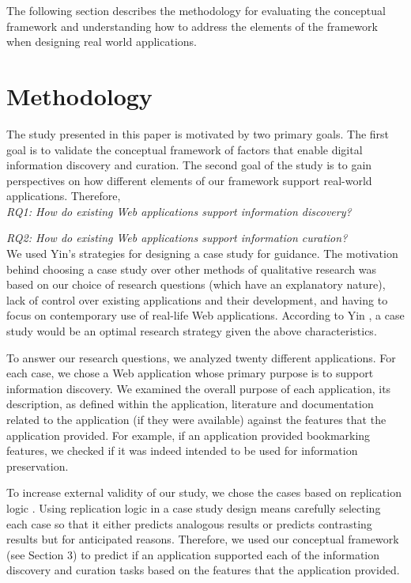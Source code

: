 \documentclass{casconpaper}
\begin{document}
The following section describes the methodology for evaluating the conceptual framework and understanding how to address the elements of the framework when designing real world applications.

{\section{Methodology}
The study presented in this paper is motivated by two primary goals. The first goal is to validate the conceptual framework of factors that enable digital information discovery and curation. The second goal of the study is to gain perspectives on how different elements of our framework support real-world applications. Therefore, 
\\

\emph{RQ1: How do existing Web applications support information discovery?}

\emph{RQ2: How do existing Web applications support information curation?}\\


We used Yin’s strategies for designing a case study \cite{yin} for guidance. The motivation behind choosing a case study over other methods of qualitative research was based on our choice of research questions (which have an explanatory nature), lack of control over existing applications and their development, and having to focus on contemporary use of real-life Web applications. According to Yin \cite{yin}, a case study would be an optimal research strategy given the above characteristics.

To answer our research questions, we analyzed twenty different applications. For each case, we chose a Web application whose primary purpose is to support information discovery. We examined the overall purpose of each application, its description, as defined within the application, literature and documentation related to the application (if they were available) against the features that the application provided. For example, if an application provided bookmarking features, we checked if it was indeed intended to be used for information preservation. 

To increase external validity of our study, we chose the cases based on replication logic \cite{yin}. Using replication logic in a case study design means carefully selecting each case so that it either predicts analogous results or predicts contrasting results but for anticipated reasons. Therefore, we used our conceptual framework (see Section 3) to predict if an application supported each of the information discovery and curation tasks based on the features that the application provided. 

}
\end{document}
